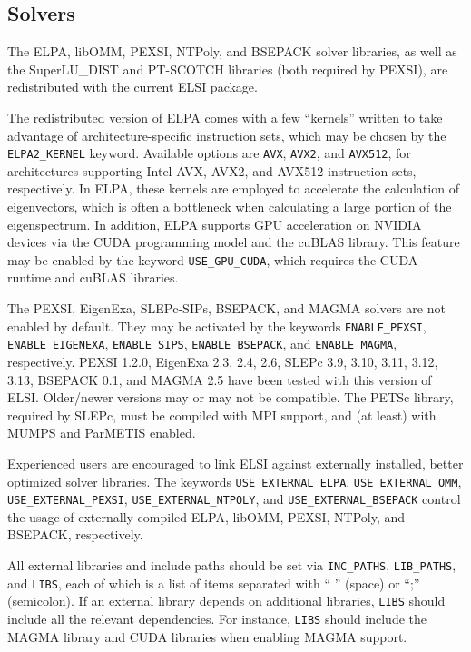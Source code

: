 \documentclass{report}
\begin{document}
\subsection{Solvers}
\label{subsec:config_solvers}
The ELPA, libOMM, PEXSI, NTPoly, and BSEPACK solver libraries, as well as the SuperLU\_DIST and PT-SCOTCH libraries (both required by PEXSI), are redistributed with the current ELSI package.

The redistributed version of ELPA comes with a few ``kernels'' written to take advantage of architecture-specific instruction sets, which may be chosen by the \texttt{ELPA2\_KERNEL} keyword. Available options are \texttt{AVX}, \texttt{AVX2}, and \texttt{AVX512}, for architectures supporting Intel AVX, AVX2, and AVX512 instruction sets, respectively. In ELPA, these kernels are employed to accelerate the calculation of eigenvectors, which is often a bottleneck when calculating a large portion of the eigenspectrum. In addition, ELPA supports GPU acceleration on NVIDIA devices via the CUDA programming model and the cuBLAS library. This feature may be enabled by the keyword \texttt{USE\_GPU\_CUDA}, which requires the CUDA runtime and cuBLAS libraries.

The PEXSI, EigenExa, SLEPc-SIPs, BSEPACK, and MAGMA solvers are not enabled by default. They may be activated by the keywords \texttt{ENABLE\_PEXSI}, \texttt{ENABLE\_EIGENEXA}, \texttt{ENABLE\_SIPS}, \texttt{ENABLE\_BSEPACK}, and \texttt{ENABLE\_MAGMA}, respectively. PEXSI 1.2.0, EigenExa 2.3, 2.4, 2.6, SLEPc 3.9, 3.10, 3.11, 3.12, 3.13, BSEPACK 0.1, and MAGMA 2.5 have been tested with this version of ELSI. Older/newer versions may or may not be compatible. The PETSc library, required by SLEPc, must be compiled with MPI support, and (at least) with MUMPS and ParMETIS enabled.

Experienced users are encouraged to link ELSI against externally installed, better optimized solver libraries. The keywords \texttt{USE\_EXTERNAL\_ELPA}, \texttt{USE\_EXTERNAL\_OMM}, \texttt{USE\_EXTERNAL\_PEXSI}, \texttt{USE\_EXTERNAL\_NTPOLY}, and \texttt{USE\_EXTERNAL\_BSEPACK} control the usage of externally compiled ELPA, libOMM, PEXSI, NTPoly, and BSEPACK, respectively.

All external libraries and include paths should be set via \texttt{INC\_PATHS}, \texttt{LIB\_PATHS}, and \texttt{LIBS}, each of which is a list of items separated with `` '' (space) or ``;'' (semicolon). If an external library depends on additional libraries, \texttt{LIBS} should include all the relevant dependencies. For instance, \texttt{LIBS} should include the MAGMA library and CUDA libraries when enabling MAGMA support.
\end{document}
